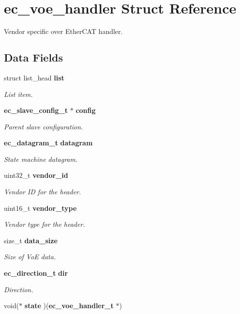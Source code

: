 \section{ec\-\_\-voe\-\_\-handler \-Struct \-Reference}
\label{structec__voe__handler}


\-Vendor specific over \-Ether\-C\-A\-T handler.  


\subsection*{\-Data \-Fields}
\begin{DoxyCompactItemize}
\item 
struct list\-\_\-head {\bf list}
\begin{DoxyCompactList}\small\item\em \-List item. \end{DoxyCompactList}\item 
{\bf ec\-\_\-slave\-\_\-config\-\_\-t} $\ast$ {\bf config}
\begin{DoxyCompactList}\small\item\em \-Parent slave configuration. \end{DoxyCompactList}\item 
{\bf ec\-\_\-datagram\-\_\-t} {\bf datagram}
\begin{DoxyCompactList}\small\item\em \-State machine datagram. \end{DoxyCompactList}\item 
uint32\-\_\-t {\bf vendor\-\_\-id}
\begin{DoxyCompactList}\small\item\em \-Vendor \-I\-D for the header. \end{DoxyCompactList}\item 
uint16\-\_\-t {\bf vendor\-\_\-type}
\begin{DoxyCompactList}\small\item\em \-Vendor type for the header. \end{DoxyCompactList}\item 
size\-\_\-t {\bf data\-\_\-size}
\begin{DoxyCompactList}\small\item\em \-Size of \-Vo\-E data. \end{DoxyCompactList}\item 
{\bf ec\-\_\-direction\-\_\-t} {\bf dir}
\begin{DoxyCompactList}\small\item\em \-Direction. \end{DoxyCompactList}\item 
void($\ast$ {\bf state} )({\bf ec\-\_\-voe\-\_\-handler\-\_\-t} $\ast$)\label{structec__voe__handler_a7d14024529e871ce3ed2bf901afc79ed}


\end{DoxyCompactItemize}
